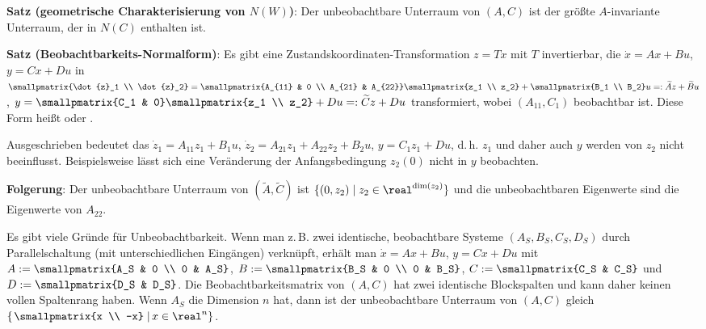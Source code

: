 \linie

\textbf{Satz (geometrische Charakterisierung von $N(W)$)}:
Der unbeobachtbare Unterraum von $(A, C)$ ist der größte $A$-invariante Unterraum,
der in $N(C)$ enthalten ist.

\textbf{Satz (Beobachtbarkeits-Normalform)}:
Es gibt eine Zustandskoordinaten-Transformation $z = Tx$ mit $T$ invertierbar,
die $\dot{x} = Ax + Bu$, $y = Cx + Du$ in
$\smallpmatrix{\dot{z}_1 \\ \dot{z}_2} = \smallpmatrix{A_{11} & 0 \\ A_{21} & A_{22}}
\smallpmatrix{z_1 \\ z_2} + \smallpmatrix{B_1 \\ B_2} u =: \widetilde{A}z + \widetilde{B}u$,
$y = \smallpmatrix{C_1 & 0} \smallpmatrix{z_1 \\ z_2} + Du =: \widetilde{C} z + Du$ transformiert,
wobei $(A_{11}, C_1)$ beobachtbar ist.
Diese Form heißt 
oder .

Ausgeschrieben bedeutet das $\dot{z}_1 = A_{11} z_1 + B_1 u$,
$\dot{z}_2 = A_{21} z_1 + A_{22} z_2 + B_2 u$, $y = C_1 z_1 + Du$,
d.\,h. $z_1$ und daher auch $y$ werden von $z_2$ nicht beeinflusst.
Beispielsweise lässt sich eine Veränderung der Anfangsbedingung $z_2(0)$ nicht in $y$ beobachten.

\textbf{Folgerung}:
Der unbeobachtbare Unterraum von $(\widetilde{A}, \widetilde{C})$ ist
$\{(0, z_2) \;|\; z_2 \in \real^{\dim(z_2)}\}$ und die unbeobachtbaren Eigenwerte sind
die Eigenwerte von $A_{22}$.

Es gibt viele Gründe für Unbeobachtbarkeit.
Wenn man z.\,B. zwei identische, beobachtbare Systeme $(A_S, B_S, C_S, D_S)$ durch
Parallelschaltung (mit unterschiedlichen Eingängen) verknüpft,
erhält man $\dot{x} = Ax + Bu$, $y = Cx + Du$ mit
$A := \smallpmatrix{A_S & 0 \\ 0 & A_S}$,
$B := \smallpmatrix{B_S & 0 \\ 0 & B_S}$,
$C := \smallpmatrix{C_S & C_S}$ und
$D := \smallpmatrix{D_S & D_S}$.
Die Beobachtbarkeitsmatrix von $(A, C)$ hat
zwei identische Blockspalten und kann daher keinen vollen Spaltenrang haben.
Wenn $A_S$ die Dimension $n$ hat, dann ist der unbeobachtbare Unterraum von $(A, C)$ gleich
$\left\{\left.\smallpmatrix{x \\ -x} \;\right| x \in \real^n\right\}$.

\linie

